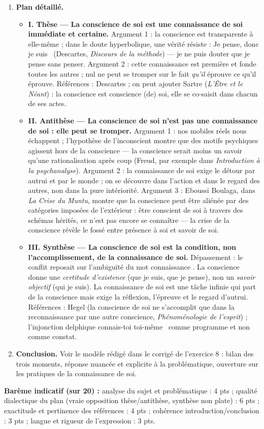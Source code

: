 \documentclass[11pt]{article}
\begin{document}
\begin{corrige}
\begin{enumerate}
\item \textbf{Plan détaillé.}
\begin{itemize}
\item \textbf{I. Thèse --- La conscience de soi est une connaissance de soi immédiate et certaine.} Argument 1 : la conscience est transparente à elle-même ; dans le doute hyperbolique, une vérité résiste : \guillemotleft Je pense, donc je suis \guillemotright\ (Descartes, \emph{Discours de la méthode}) --- je ne puis douter que je pense sans penser. Argument 2 : cette connaissance est première et fonde toutes les autres ; nul ne peut se tromper sur le fait \emph{qu'il} éprouve ce qu'il éprouve. Références : Descartes ; on peut ajouter Sartre (\emph{L'Être et le Néant}) : la conscience est conscience (de) soi, elle se co-saisit dans chacun de ses actes.
\item \textbf{II. Antithèse --- La conscience de soi n'est pas une connaissance de soi : elle peut se tromper.} Argument 1 : nos mobiles réels nous échappent ; l'hypothèse de l'inconscient montre que des motifs psychiques agissent hors de la conscience --- la conscience serait moins un savoir qu'une rationalisation après coup (Freud, par exemple dans \emph{Introduction à la psychanalyse}). Argument 2 : la connaissance de soi exige le détour par autrui et par le monde ; on se découvre dans l'action et dans le regard des autres, non dans la pure intériorité. Argument 3 : Eboussi Boulaga, dans \emph{La Crise du Muntu}, montre que la conscience peut être aliénée par des catégories imposées de l'extérieur : être conscient de soi à travers des schémas hérités, ce n'est pas encore se connaître --- la crise de la conscience révèle le fossé entre présence à soi et savoir de soi.
\item \textbf{III. Synthèse --- La conscience de soi est la condition, non l'accomplissement, de la connaissance de soi.} Dépassement : le conflit reposait sur l'ambiguïté du mot \guillemotleft connaissance \guillemotright. La conscience donne une \emph{certitude d'existence} (que je suis, que je pense), non un \emph{savoir objectif} (qui je suis). La connaissance de soi est une tâche infinie qui part de la conscience mais exige la réflexion, l'épreuve et le regard d'autrui. Références : Hegel (la conscience de soi ne s'accomplit que dans la reconnaissance par une autre conscience, \emph{Phénoménologie de l'esprit}) ; l'injonction delphique \guillemotleft connais-toi toi-même \guillemotright\ comme programme et non comme constat.
\end{itemize}
\item \textbf{Conclusion.} Voir le modèle rédigé dans le corrigé de l'exercice 8 : bilan des trois moments, réponse nuancée et explicite à la problématique, ouverture sur les pratiques de la connaissance de soi.
\end{enumerate}
\textbf{Barème indicatif (sur 20) :} analyse du sujet et problématique : 4 pts ; qualité dialectique du plan (vraie opposition thèse/antithèse, synthèse non plate) : 6 pts ; exactitude et pertinence des références : 4 pts ; cohérence introduction/conclusion : 3 pts ; langue et rigueur de l'expression : 3 pts.


\end{corrige}
\end{document}
